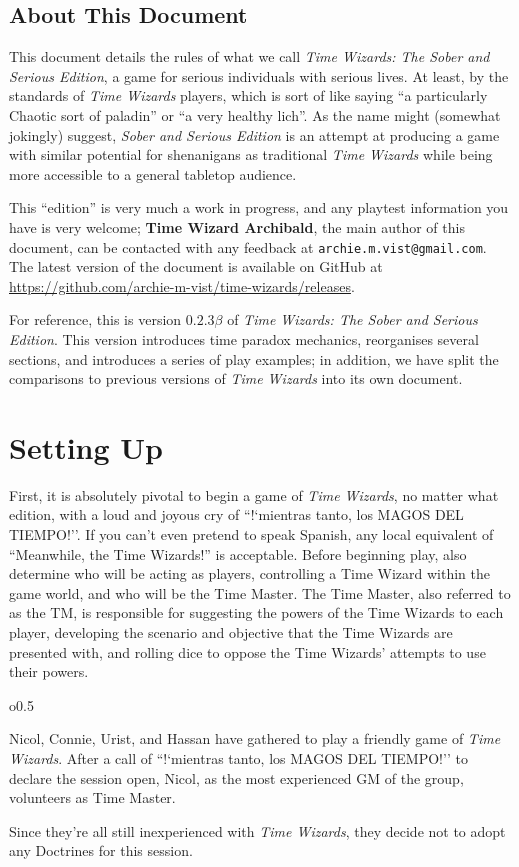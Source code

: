 \documentclass[twoside]{article}
\newcommand{\mientrastanto}{``!`mientras tanto, los MAGOS DEL TIEMPO!''}
\newcommand{\twsse}{\emph{Time Wizards: The Sober and Serious Edition}}
\newcommand{\tw}{\emph{Time Wizards}}
\newcommand{\sse}{\emph{Sober and Serious Edition}}
\newcommand{\vers}{$0.2.3 \beta$}
\newcommand{\namefag}[2][]{{\color{anongreen} \textbf{#2}#1}}
\newenvironment{examplebox}[1]{\begin{tcolorbox}[colback=green!5!white,colframe=green!75!black,title={Example: #1}]}{\end{tcolorbox}\vspace{-30pt}}
\begin{document}
\subsection{About This Document} \label{ssec:rulesintro}
This document details the rules of what we call \twsse{}, a game for serious individuals
with serious lives. At least, by the standards of \tw{} players, which is sort of like saying
``a particularly Chaotic sort of paladin'' or ``a very healthy lich''. As the name might 
(somewhat jokingly) suggest, \sse{} is an attempt at producing a game with similar potential for
shenanigans as traditional \tw{} while being more accessible to a general tabletop audience.

This ``edition'' is very much a work in progress, and any playtest information you have is very
welcome; \namefag{Time Wizard Archibald}, the main author of this document, can be contacted with
any feedback at \verb|archie.m.vist@gmail.com|. The latest version of the document is available
on GitHub at \url{https://github.com/archie-m-vist/time-wizards/releases}.

For reference, this is version \vers{} of \twsse. This version introduces time paradox
mechanics, reorganises several sections, and introduces a series of play examples; in addition,
we have split the comparisons to previous versions of \tw{} into its own document.

\section{Setting Up} \label{sec:setup}
First, it is absolutely pivotal to begin a game of \tw{}, no matter what edition, with a loud
and joyous cry of \mientrastanto. If you can't even pretend to speak Spanish, any local
equivalent of ``Meanwhile, the Time Wizards!'' is acceptable. Before beginning play, also
determine who will be acting as players, controlling a Time Wizard within the game world, and
who will be the Time Master. The Time Master, also referred to as the TM, is responsible for
suggesting the powers of the Time Wizards to each player, developing the scenario and objective
that the Time Wizards are presented with, and rolling dice to oppose the Time Wizards' attempts
to use their powers.

\begin{wrapfigure}{o}{0.5\textwidth}
   \vspace{-10pt}
   \begin{examplebox}{Beginning Play}
      Nicol, Connie, Urist, and Hassan have gathered to play a friendly game of \tw{}. After a
      call of \mientrastanto{} to declare the session open, Nicol, as the most experienced GM of
      the group, volunteers as Time Master.

      Since they're all still inexperienced with \tw{}, they decide not to adopt any Doctrines
      for this session.
   \end{examplebox}
   \vspace{15pt}
\end{wrapfigure}
\end{document}
